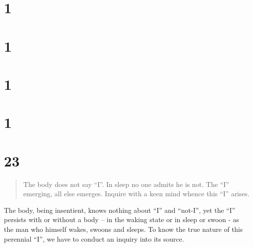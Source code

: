 \documentclass[12pt]{report}
\begin{document}
\section*{1}

\begin{quote}

\end{quote}


\section*{1}

\begin{quote}

\end{quote}


\section*{1}

\begin{quote}

\end{quote}


\section*{1}

\begin{quote}

\end{quote}




\section*{23}

\begin{quote}
The body does not say ``I''. In sleep no one admits he is not. The
``I'' emerging, all else emerges. Inquire with a keen mind whence this
``I'' arises.
\end{quote}

The body, being insentient, knows nothing about ``I'' and ``not-I'',
yet the ``I'' persists with or without a body -- in the waking state
or in sleep or swoon - as the man who himself wakes, swoons and
sleeps. To know the true nature of this perennial ``I'', we have to
conduct an inquiry into its source.
\end{document}
